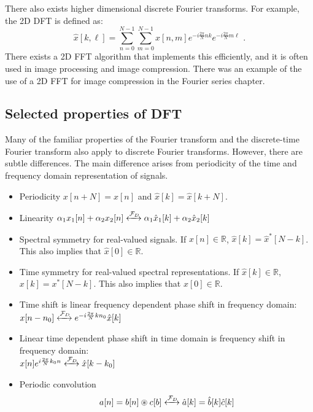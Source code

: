 There also exists higher dimensional discrete Fourier transforms. For example, the 2D DFT is defined as:
\begin{equation}
  \hat{x}[k,\ell] = \sum_{n=0}^{N-1}\sum_{m=0}^{N-1} x[n,m] e^{-i \frac{2\pi}{N}nk }e^{-i \frac{2\pi}{N}m\ell } \,\,.
\end{equation}
There exists a 2D FFT algorithm that implements this efficiently, and
it is often used in image processing and image compression. There was
an example of the use of a 2D FFT for image compression in the Fourier
series chapter.

  \subsection{Selected properties of DFT}

  Many of the familiar properties of the Fourier transform and the
  discrete-time Fourier transform also apply to discrete Fourier
  transforms. However, there are subtle differences. The main difference
  arises from periodicity of the time and frequency domain
  representation of signals.
  \begin{itemize}
    \item Periodicity $x[n+N]=x[n]$ and $\hat{x}[k]=\hat{x}[k+N]$.
    \item Linearity $\alpha_1 x_1[n] + \alpha_2x_2[n] \xleftrightarrow{\mathcal{F}_D} \alpha_1 \hat{x}_1[k] + \alpha_2 \hat{x}_2[k]$

    \item Spectral symmetry for real-valued signals. If $x[n] \in \mathbb{R}$, $\hat{x}[k]=\hat{x}^*[N-k]$. This also implies that $\hat{x}[0]\in \mathbb{R}$.

    \item Time symmetry for real-valued spectral representations. If $\hat{x}[k] \in \mathbb{R}$, $x[k]=x^*[N-k]$. This also implies that $x[0]\in \mathbb{R}$.

    \item Time shift is linear frequency dependent phase shift in frequency domain:\\ $x[n-n_0]\xleftrightarrow{\mathcal{F}_D} e^{-i\frac{2\pi}{N}k n_0}\hat{x}[k]$
    \item Linear time dependent phase shift in time domain is frequency shift in frequency domain:\\ $x[n]e^{i\frac{2\pi}{N}k_0 n} \xleftrightarrow{\mathcal{F}_D} \hat{x}[k-k_0]$
    \item Periodic convolution
          \begin{equation}
            a[n]=b[n]\circledast c[b]\xleftrightarrow{\mathcal{F}_D} \hat{a}[k]=\hat{b}[k]\hat{c}[k]
          \end{equation}
  \end{itemize}
\fi

